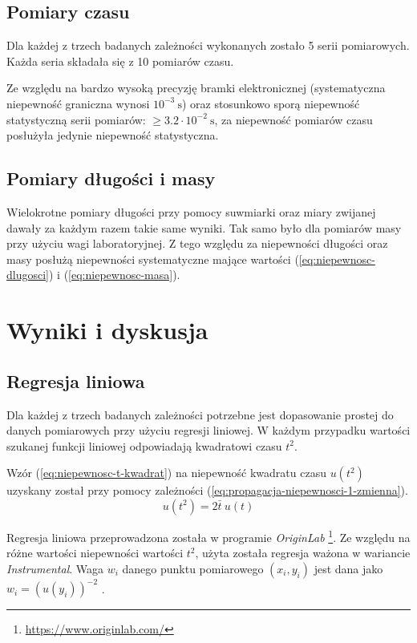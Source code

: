 \documentclass[twocolumn, a4paper, polish, 10pt]{article}
\begin{document}
\subsection{Pomiary czasu}
Dla każdej z trzech badanych zależności wykonanych zostało 5 serii pomiarowych. Każda seria składała się z 10 pomiarów czasu.

Ze względu na bardzo wysoką precyzję bramki elektronicznej (systematyczna niepewność graniczna wynosi $10^{-3}~\mathrm{s}$) oraz stosunkowo sporą niepewność statystyczną serii pomiarów: $\ge 3.2 \cdot 10^{-2}~\mathrm{s}$, za niepewność pomiarów czasu posłużyła jedynie niepewność statystyczna.

\subsection{Pomiary długości i masy}
Wielokrotne pomiary długości przy pomocy suwmiarki oraz miary zwijanej dawały za każdym razem takie same wyniki. Tak samo było dla pomiarów masy przy użyciu wagi laboratoryjnej. Z tego względu za niepewności długości oraz masy posłużą niepewności systematyczne mające wartości (\ref{eq:niepewnosc-dlugosci}) i (\ref{eq:niepewnosc-masa}).

\section{Wyniki i dyskusja}
\subsection{Regresja liniowa}
Dla każdej z trzech badanych zależności potrzebne jest dopasowanie prostej do danych pomiarowych przy użyciu regresji liniowej. W każdym przypadku wartości szukanej funkcji liniowej odpowiadają kwadratowi czasu $t^2$. 

Wzór (\ref{eq:niepewnosc-t-kwadrat}) na niepewność kwadratu czasu $u(t^2)$ uzyskany został przy pomocy zależności (\ref{eq:propagacja-niepewnosci-1-zmienna}).
\begin{equation}
    u(t^2) = 2\bar{t}~u(t)
    \label{eq:niepewnosc-t-kwadrat}
\end{equation}

Regresja liniowa przeprowadzona została w programie \textit{OriginLab} \footnote{\url{https://www.originlab.com/}}. Ze względu na różne wartości niepewności wartości $t^2$, użyta została regresja ważona w wariancie \textit{Instrumental}. Waga $w_i$ danego punktu pomiarowego $(x_i, y_i)$ jest dana jako $w_i = \left( u(y_i) \right)^{-2}$ \cite{origin-fitting-weighting}.
\end{document}
